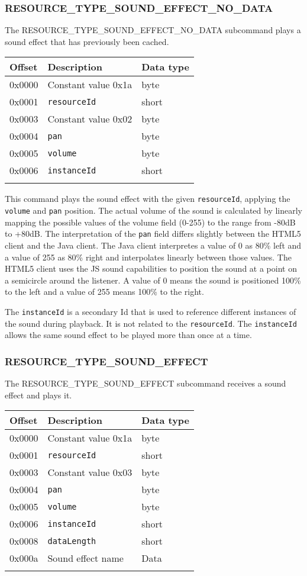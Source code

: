\documentclass{article}
\newcommand{\field}[1]{\textcolor{fieldColor}{\texttt{#1}}}
\newenvironment{bytelisting}
{\ttfamily \begin{center} \begin{tabular}{l l l} Offset & Description & Data type \\ \hline}
{\normalfont \end{tabular} \end{center}}
\begin{document}
\subsubsection{RESOURCE\_TYPE\_SOUND\_EFFECT\_NO\_DATA}
The RESOURCE\_TYPE\_SOUND\_EFFECT\_NO\_DATA subcommand plays a sound effect that has previously been cached.

\begin{bytelisting}
0x0000 & Constant value 0x1a & byte \\
0x0001 & \field{resourceId} & short \\
0x0003 & Constant value 0x02 & byte \\
0x0004 & \field{pan} & byte \\
0x0005 & \field{volume} & byte \\
0x0006 & \field{instanceId} & short \\
\end{bytelisting}

This command plays the sound effect with the given \field{resourceId}, applying the \field{volume} and \field{pan} position. The actual volume of the sound is calculated by linearly mapping the possible values of the 
volume field (0-255) to the range from -80dB to +80dB. The interpretation of the \field{pan} field differs slightly between the HTML5 client and the Java client. The Java client interpretes a value of 0 as 
80\% left and a value of 255 as 80\% right and interpolates linearly between those values. The HTML5 client uses the JS sound capabilities to position the sound at a point on a semicircle around the
listener. A value of 0 means the sound is positioned 100\% to the left and a value of 255 means 100\% to the right.

The \field{instanceId} is a secondary Id that is used to reference different instances of the sound during playback. It is not related to the \field{resourceId}.
The \field{instanceId} allows the same sound effect to be played more than once at a time.

\subsubsection{RESOURCE\_TYPE\_SOUND\_EFFECT}
The RESOURCE\_TYPE\_SOUND\_EFFECT subcommand receives a sound effect and plays it.

\begin{bytelisting}
0x0000 & Constant value 0x1a & byte \\
0x0001 & \field{resourceId} & short \\
0x0003 & Constant value 0x03 & byte \\
0x0004 & \field{pan} & byte \\
0x0005 & \field{volume} & byte \\
0x0006 & \field{instanceId} & short \\
0x0008 & \field{dataLength} & short \\
0x000a & Sound effect name & Data \\
\end{bytelisting}
\end{document}
